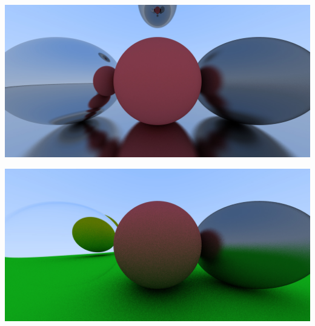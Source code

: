 \documentclass{beamer}
\begin{document}
\begin{frame}
	\includegraphics[width=\linewidth]{fuzemetal.jpg}
\end{frame}
\begin{frame}
	\includegraphics[width=\linewidth]{sec.jpg}
\end{frame}

\end{document}
